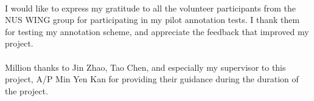 \documentclass[hyp]{socreport}
\begin{document}
\begin{acknowledgement}
\paragraph{}
I would like to express my gratitude to all the volunteer participants from the NUS WING group for participating in my pilot annotation tests. I thank them for testing my annotation scheme, and appreciate the feedback that improved my project.

\paragraph{}
Million thanks to Jin Zhao, Tao Chen, and especially my supervisor to this project, A/P Min Yen Kan for providing their guidance during the duration of the project.
\end{acknowledgement}

\listoffigures
\listoftables
\tableofcontents





 




\appendix

\end{document}
